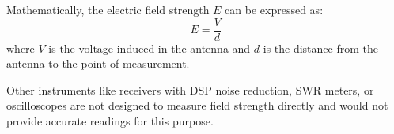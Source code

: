 Mathematically, the electric field strength \( E \) can be expressed as:
\[ E = \frac{V}{d} \]
where \( V \) is the voltage induced in the antenna and \( d \) is the distance from the antenna to the point of measurement.

Other instruments like receivers with DSP noise reduction, SWR meters, or oscilloscopes are not designed to measure field strength directly and would not provide accurate readings for this purpose.

